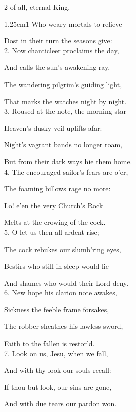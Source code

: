 \begin{multicols}{2}
\sloppy
{} of all, eternal King,


\begin{hangparas}{1.25em}{1}
Who weary mortals to relieve

Dost in their turn the seasons give:\\

2. Now chanticleer proclaims the day,

And calls the sun's awakening ray,

The wandering pilgrim's guiding light,

That marks the watches night by night.\\

3. Roused at the note, the morning star

Heaven's dusky veil uplifts afar:

Night's vagrant bands no longer roam,

But from their dark ways hie them home.\\

4. The encouraged sailor's fears are o'er,

The foaming billows rage no more:

Lo! e'en the very Church's Rock

Melts at the crowing of the cock.\\

5. O let us then all ardent rise;

The cock rebukes our slumb'ring eyes,

Bestirs who still in sleep would lie

And shames who would their Lord deny.\\

6. New hope his clarion note awakes,

Sickness the feeble frame forsakes,

The robber sheathes his lawless sword,

Faith to the fallen is restor'd.\\

7. Look on us, Jesu, when we fall,

And with thy look our souls recall:

If thou but look, our sins are gone,

And with due tears our pardon won.\\


\end{hangparas}
\end{multicols}
